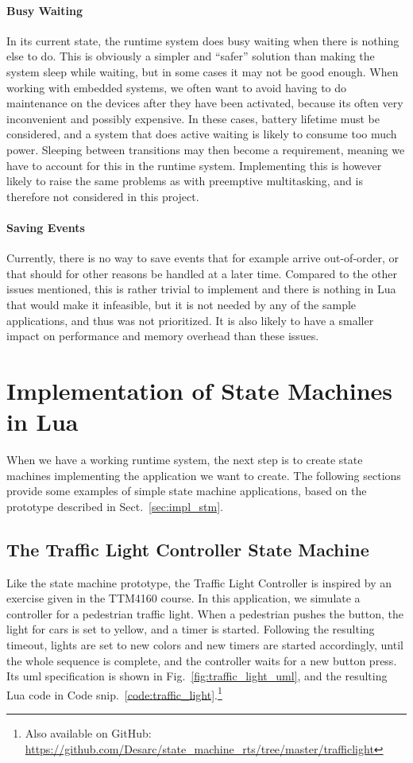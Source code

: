 \paragraph{Busy Waiting} In its current state, the runtime system does busy waiting when there is nothing else to do. This is obviously a simpler and ``safer'' solution than making the system sleep while waiting, but in some cases it may not be good enough. When working with embedded systems, we often want to avoid having to do maintenance on the devices after they have been activated, because its often very inconvenient and possibly expensive. In these cases, battery lifetime must be considered, and a system that does active waiting is likely to consume too much power. Sleeping between transitions may then become a requirement, meaning we have to account for this in the runtime system. Implementing this is however likely to raise the same problems as with preemptive multitasking, and is therefore not considered in this project.

\paragraph{Saving Events} Currently, there is no way to save events that for example arrive out-of-order, or that should for other reasons be handled at a later time. Compared to the other issues mentioned, this is rather trivial to implement and there is nothing in Lua that would make it infeasible, but it is not needed by any of the sample applications, and thus was not prioritized. It is also likely to have a smaller impact on performance and memory overhead than these issues.

\section{Implementation of State Machines in Lua}
\label{sec:impl_state_machines}
When we have a working runtime system, the next step is to create state machines implementing the application we want to create. The following sections provide some examples of simple state machine applications, based on the prototype described in Sect.~\ref{sec:impl_stm}.

\subsection{The Traffic Light Controller State Machine}
\label{sec:impl_traffic_light}
Like the state machine prototype, the Traffic Light Controller is inspired by an exercise given in the TTM4160 course. In this application, we simulate a controller for a pedestrian traffic light. When a pedestrian pushes the button, the light for cars is set to yellow, and a timer is started. Following the resulting timeout, lights are set to new colors and new timers are started accordingly, until the whole sequence is complete, and the controller waits for a new button press. Its \gls{uml} specification is shown in Fig.~\ref{fig:traffic_light_uml}, and the resulting Lua code in Code snip.~\ref{code:traffic_light}.\footnote{Also available on GitHub: \url{https://github.com/Desarc/state_machine_rts/tree/master/trafficlight}}

